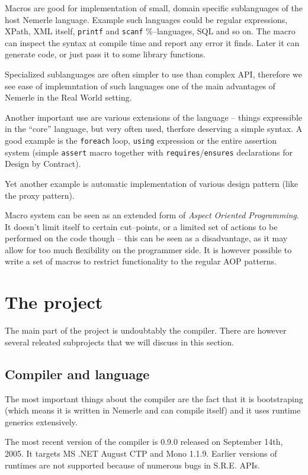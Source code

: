 \documentclass{article}
\begin{document}
Macros are good for implementation of small, domain specific sublanguages
of the host Nemerle language. Example such languages could be
regular expressions, XPath, XML itself, \texttt{printf} and \texttt{scanf}
\%--languages, SQL and so on. The macro can inspect the syntax
at compile time and report any error it finds. Later it can generate code,
or just pass it to some library functions.

Specialized sublanguages are often simpler to use than complex
API, therefore we see ease of implemntation of such languages
one of the main advantages of Nemerle in the Real World setting.

Another important use  are various extensions of the language
-- things expressible in the ``core'' language, but very often
used, therfore deserving a simple syntax. A good example is
the \texttt{foreach} loop, \texttt{using} expression or the
entire assertion system (simple \texttt{assert} macro together
with \texttt{requires}/\texttt{ensures} declarations for
Design by Contract). 

Yet another example is automatic implementation of various
design pattern (like the proxy pattern).

Macro system can be seen as an extended form of 
\textit{Aspect Oriented Programming}. It doesn't limit
itself to certain cut--points, or a limited set of actions
to be performed on the code though -- this can be seen as a 
disadvantage, as it may allow for too much flexibility on
the programmer side. It is however possible to write a set
of macros to restrict functionality to the regular AOP patterns. 


\section{The project}

The main part of the project is undoubtably the compiler.
There are however several releated subprojects that we will
discuss in this section.

\subsection{Compiler and language}

The most important things about the compiler are the
fact that it is bootstraping (which means it is written
in Nemerle and can compile itself) and it uses runtime
generics extensively.

The most recent version of the compiler is 0.9.0 released
on September 14th, 2005. It targets MS .NET August CTP
and Mono 1.1.9. Earlier versions of runtimes are not
supported because of numerous bugs in S.R.E. APIs.
\end{document}
